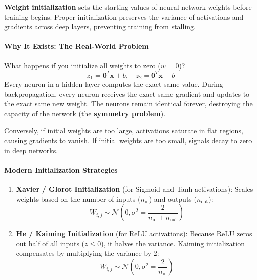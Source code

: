 \begin{keyidea}
\textbf{Weight initialization} sets the starting values of neural network weights before training begins. Proper initialization preserves the variance of activations and gradients across deep layers, preventing training from stalling.
\end{keyidea}

\paragraph{Why It Exists: The Real-World Problem}
What happens if you initialize all weights to zero ($w = 0$)?
\begin{equation*}
z_1 = \mathbf{0}^T \mathbf{x} + b, \quad z_2 = \mathbf{0}^T \mathbf{x} + b
\end{equation*}
Every neuron in a hidden layer computes the exact same value. During backpropagation, every neuron receives the exact same gradient and updates to the exact same new weight. The neurons remain identical forever, destroying the capacity of the network (the \textbf{symmetry problem}). 

Conversely, if initial weights are too large, activations saturate in flat regions, causing gradients to vanish. If initial weights are too small, signals decay to zero in deep networks.

\paragraph{Modern Initialization Strategies}
\begin{enumerate}
    \item \textbf{Xavier / Glorot Initialization} (for Sigmoid and Tanh activations):
    Scales weights based on the number of inputs ($n_{\text{in}}$) and outputs ($n_{\text{out}}$):
    \begin{equation}
    W_{i,j} \sim \mathcal{N}\left(0, \sigma^2 = \frac{2}{n_{\text{in}} + n_{\text{out}}}\right)\label{eq:xavier_init}
    \end{equation}
    
    \item \textbf{He / Kaiming Initialization} (for ReLU activations):
    Because ReLU zeros out half of all inputs ($z \le 0$), it halves the variance. Kaiming initialization compensates by multiplying the variance by $2$:
    \begin{equation}
    W_{i,j} \sim \mathcal{N}\left(0, \sigma^2 = \frac{2}{n_{\text{in}}}\right)\label{eq:kaiming_init}
    \end{equation}
\end{enumerate}

